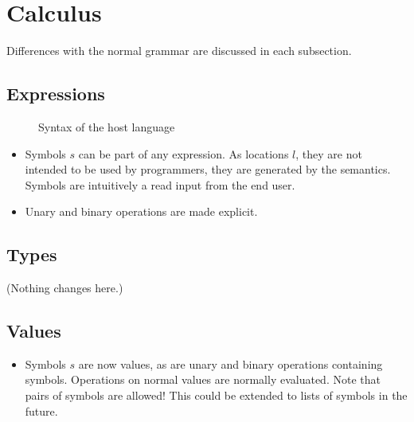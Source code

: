 

\section{Calculus}
\label{sec:language}

Differences with the normal grammar are discussed in each subsection.


\subsection{Expressions}

\begin{figure}
\label{language}
\caption{Syntax of the host language}
\end{figure}

\begin{itemize}
  \item
    Symbols $s$ can be part of any expression.
    As locations $l$, they are not intended to be used by programmers,
    they are generated by the semantics.
    Symbols are intuitively a read input from the end user.
  \item
    Unary and binary operations are made explicit.
\end{itemize}


\subsection{Types}


(Nothing changes here.)


\subsection{Values}


\begin{itemize}
  \item
    Symbols $s$ are now values,
    as are unary and binary operations containing symbols.
    Operations on normal values are normally evaluated.
    Note that pairs of symbols are allowed!
    This could be extended to lists of symbols in the future.
\end{itemize}


